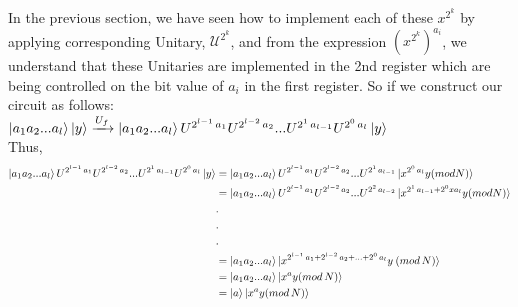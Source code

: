 \documentclass[11.5pt, paper=a4]{article}
\theoremstyle{definition}
\numberwithin{theorem}{section}
\begin{document}
In the previous section, we have seen how to implement each of these $x^{2^k}$ by applying corresponding Unitary, $\mathcal{U}^{2^k}$, and from the expression ${(x^{2^{k}})}^{a_i}$, we understand that these Unitaries are implemented in the 2nd register which are being controlled on the bit value of $a_i$ in the first register. So if we construct our circuit as follows:\\

{$\ket{a_1 a_2 ... a_l}\ket{y} \xrightarrow{U_f} \ket{a_1 a_2 ... a_l} U^{2^{l-1}\, a_1} U^{2^{l-2}\, a_2} ... U^{2^{1}\, a_{l-1}} U^{2^{0}\, a_l} \ket{y}$}\\

Thus,\
\begin{equation}
\begin{split}
     \ket{a_1 a_2 ... a_l} U^{2^{l-1}\, a_1} U^{2^{l-2}\, a_2} ... U^{2^{1}\, a_{l-1}} U^{2^{0}\, a_l} \ket{y} & = \ket{a_1 a_2 ... a_l} U^{2^{l-1}\, a_1} U^{2^{l-2}\, a_2} ... U^{2^{1}\, a_{l-1}} \ket{{x^{2^0\, a_l}} y (mod N)}\\
     & = \ket{a_1 a_2 ... a_l} U^{2^{l-1}\, a_1} U^{2^{l-2}\, a_2} ... U^{2^{2}\, a_{l-2}} \ket{{x^{2^1\, a_{l-1} + 2^0 x a_l}} y (mod N)}\\
     & .\\
     & .\\
     & .\\
     & = \ket{a_1 a_2 ... a_l} \ket{{x^{2^{l-1}\, a_1 + 2^{l-2}\, a_{2} + ... + 2^0\, a_l}} y\: (mod\, N)}\\
     & = \ket{a_1 a_2 ... a_l}\ket{x^a y(mod\,N)}\\
     & = \ket{a}\ket{x^a y(mod\,N)}
\end{split}
\end{equation}
\end{document}
